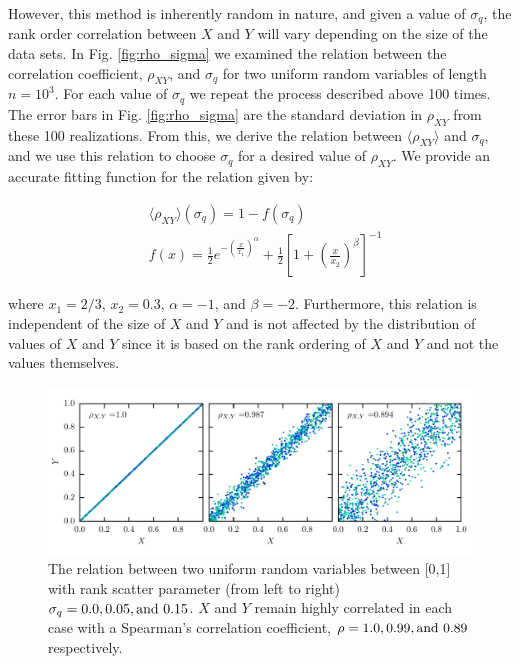 \documentclass[a4paper,fleqn,usenatbib]{mnras}
\begin{document}
However, this method is inherently random in nature, and given a value of $\sigma_q$, the rank order correlation between $X$ and $Y$ will vary depending on the size of the data sets.  In Fig. \ref{fig:rho_sigma} we examined the relation between the correlation coefficient, $\rho_{XY}$, and $\sigma_q$ for two uniform random variables of length $n=10^{3}$.  For each value of $\sigma_q$ we repeat the process described above 100 times.  The error bars in Fig. \ref{fig:rho_sigma} are the standard deviation in $\rho_{XY}$ from these 100 realizations.  From this, we derive the relation between $\langle \rho_{XY} \rangle$ and $\sigma_q$, and we use this relation to choose $\sigma_q$ for a desired value of $\rho_{XY}$.  We provide an accurate fitting function for the relation given by:
%
\begin{linenomath}
\begin{align}
\label{eq:rho_fit_func}
&\langle \rho_{XY} \rangle(\sigma_q) = 1-f(\sigma_q) \\
&f(x) = \frac{1}{2}e^{-\left(\frac{x}{x_1}\right)^{\alpha}} + \frac{1}{2} \left[1+ \left( \frac{x}{x_2} \right)^{\beta} \right]^{-1} \nonumber
\end{align}
\end{linenomath}
% 
where $x_1=2/3$, $x_2=0.3$, $\alpha=-1$, and $\beta=-2$.  Furthermore, this relation is independent of the size of $X$ and $Y$ and is not affected by the distribution of values of $X$ and $Y$ since it is based on the rank ordering of $X$ and $Y$ and not the values themselves.

%
\begin{figure}
\includegraphics[]{figures/xy_scatter_2.pdf}
\caption{The relation between two uniform random variables between [0,1] with rank scatter parameter (from left to right) $\sigma_q=0.0, 0.05, {\rm and}~ 0.15$.  $X$ and $Y$ remain highly correlated in each case with a Spearman's correlation coefficient, $\rho=1.0, 0.99, {\rm and} ~0.89$ respectively.}
\label{fig:xy_scatter}
\end{figure}
%
\end{document}
